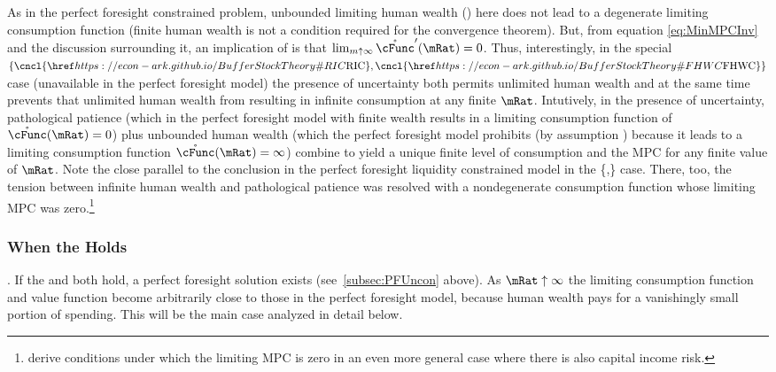 \documentclass[BufferStockTheory]{subfiles}
\begin{document}
As in the perfect foresight constrained problem, unbounded limiting human wealth (\cncl{\FHWC}) here does not lead to a degenerate limiting consumption function (finite human wealth is not a condition required for the convergence theorem).  But, from equation \eqref{eq:MinMPCInv} and the discussion surrounding it, an implication of \cncl{\RIC} is that $\lim_{m \uparrow \infty} \mathring{\cFunc}^{\prime}(\mRat) = 0$.  Thus, interestingly, in the special $\{\cncl{\RIC},\cncl{\FHWC}\}$ case (unavailable in the perfect foresight model) the presence of uncertainty both permits unlimited human wealth and at the same time prevents that unlimited human wealth from resulting in infinite consumption at any finite $\mRat$.  Intutively, in the presence of uncertainty, pathological patience (which in the perfect foresight model with finite wealth results in a limiting consumption function of $\mathring{\cFunc}(\mRat)=0$) plus unbounded human wealth (which the perfect foresight model prohibits (by assumption {\FHWC}) because it leads to a limiting consumption function $\mathring{\cFunc}(\mRat)=\infty$) combine to yield a unique finite level of consumption and the MPC for any finite value of $\mRat$.  Note the close parallel to the conclusion in the perfect foresight liquidity constrained model in the \{\GICAbs,\cncl{\RIC}\} case.  There, too, the tension between infinite human wealth and pathological patience was resolved with a nondegenerate consumption function whose limiting MPC was zero.\footnote{\cite{maTodaRich} derive conditions under which the limiting MPC is zero in an even more general case where there is also capital income risk.}

\hypertarget{When-the-RIC-Holds}{}
\subsubsection{When the {\RIC} Holds}\label{subsubsec:WhenTheGICNrmFails}  \label{subsubsec:WhenTheRICHolds} 

\indent \textbf{\FHWC}.  If the {\RIC} and {\FHWC} both hold, a perfect foresight solution exists (see~\ref{subsec:PFUncon} above).  As $\mRat \uparrow \infty$ the limiting consumption function and value function become arbitrarily close to those in the perfect foresight model, because human wealth pays for a vanishingly small portion of spending.  This will be the main case analyzed in detail below.
\end{document}
